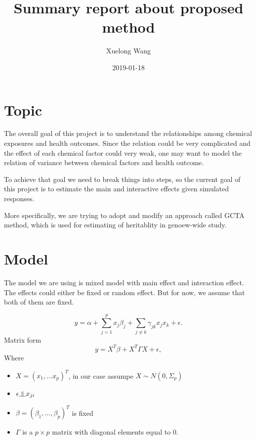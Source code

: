 \documentclass[]{article}
\title{Summary report about proposed method}
\author{Xuelong Wang}
\date{2019-01-18}
\providecommand{\tightlist}{%
  \setlength{\itemsep}{0pt}\setlength{\parskip}{0pt}}
\newcommand{\indep}{\rotatebox[origin=c]{90}{$\models$}}
\begin{document}
\maketitle

{
\setcounter{tocdepth}{2}
\tableofcontents
}
\section{Topic}\label{topic}

The overall goal of this project is to understand the relationships
among chemical exposures and health outcomes. Since the relation could
be very complicated and the effect of each chemical factor could very
weak, one may want to model the relation of variance between chemical
factors and health outcome.

To achieve that goal we need to break things into steps, so the current
goal of this project is to estimate the main and interactive effects
given simulated responses.

More specifically, we are trying to adopt and modify an approach called
GCTA method, which is used for estimating of heritablity in genoew-wide
study.

\section{Model}\label{model}

The model we are using is mixed model with main effect and interaction
effect. The effects could either be fixed or random effect. But for now,
we assume that both of them are fixed.

\[
  y = \alpha + \sum_{j = 1}^p x_j\beta_j + \sum_{j \neq k} \gamma_{jk}x_jx_k + \epsilon.
\] Matrix form \[
  y = X^T\beta + X^T\Gamma X + \epsilon,
\] Where

\begin{itemize}
\tightlist
\item
  \(X = (x_{1}, \dots x_{p})^T\), in our case assumpe
  \(X \sim N(0, \Sigma_p)\)\\
\item
  \(\epsilon \indep x_{ji}\)\\
\item
  \(\beta = (\beta_1, \dots, \beta_p)^T\) is fixed\\
\item
  \(\Gamma\) is a \(p \times p\) matrix with diagonal elements equal to
  0.
\end{itemize}
\end{document}
